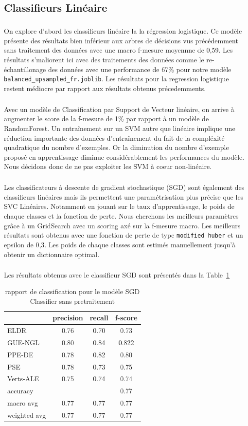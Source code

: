 \documentclass[11pt]{article}
\begin{document}
\subsection{Classifieurs Linéaire}
\subparagraph{}
On explore d'abord les classifieurs linéaire la la régression logistique. Ce modèle présente des résultats bien inférieur aux arbres de décisions vus précédemment sans traitement des données avec une macro f-mesure moyennne de 0,59. Les résultats s'maliorent ici avec des traitements des données comme le re-échantillonage des données avec une performance de 67\% pour notre modèle  \texttt{balanced\_upsampled\_fr.joblib}. Les résultats pour la regression logistique restent médiocre par rapport aux résultats obtenus précedemments.
\subparagraph{}
Avec un modèle de Classification par Support de Vecteur linéaire, on arrive à augmenter le score de la f-mesure de 1\% par rapport à un modèle de RandomForest. Un entraînement sur un SVM autre que linéaire implique une réduction importante des données d'entraînement du fait de la compléxité quadratique du nombre d'exemples. Or la diminution du nombre d'exemple proposé en apprentissage diminue considérablement les performances du modèle. Nous décidons donc de ne pas exploiter les SVM à coeur non-linéaire.
\subparagraph{}
Les classificateurs à descente de gradient stochastique (SGD) sont également des classifieurs linéaires mais ils permettent une paramétrisation plus précise que les SVC Linéaires. Notamment en jouant sur le taux d'apprentissage, le poids de chaque classes et la fonction de perte. Nous cherchons les meilleurs paramètres grâce à un GridSearch avec un scoring axé sur la f-mesure macro.
Les meilleurs résultats sont obtenus avec une fonction de perte de type \texttt{modified huber} et un epsilon de 0,3. Les poids de chaque classes sont estimés manuellement jusqu'à obtenir un dictionnaire optimal.
\subparagraph{}
Les résultats obtenus avec le classifieur SGD sont présentés dans la Table~\ref{tab:SGD}

\begin{table}[h]
\centering
\begin{tabular}{lccc}
\hline
 & precision & recall & f-score\\
\hline
ELDR & 0.76 &  0.70& 0.73\\
GUE-NGL& 0.80 & 0.84 & 0.822\\
PPE-DE & 0.78 &  0.82  & 0.80 \\ 
PSE &  0.78 &  0.73 & 0.75\\ 
Verts-ALE &  0.75 & 0.74&  0.74\\
\hline
accuracy& & &    0.77 \\
macro avg &  0.77 &  0.77 &  0.77 \\
weighted avg &  0.77 & 0.77  &  0.77  \\
\hline
\end{tabular}
\caption{rapport de classification pour le modèle SGD Classifier sans pretraitement}
\label{tab:SGD}
\end{table}
\end{document}
